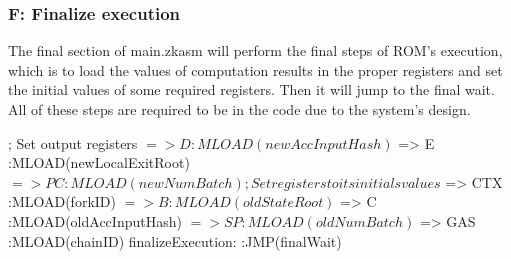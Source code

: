 


\subsubsection{F: Finalize execution}

The final section of main.zkasm will perform the final steps of ROM's execution, which is to load the values of computation results in the proper registers and set the initial values of some required registers. Then it will jump to the final wait. All of these steps are required to be in the code due to the system's design.

\begin{zkasm}
    ; Set output registers
    $ => D                          :MLOAD(newAccInputHash)
    $ => E                          :MLOAD(newLocalExitRoot)
    $ => PC                         :MLOAD(newNumBatch)
    
    ; Set registers to its initials values
    $ => CTX                        :MLOAD(forkID)
    $ => B                          :MLOAD(oldStateRoot)
    $ => C                          :MLOAD(oldAccInputHash)
    $ => SP                         :MLOAD(oldNumBatch)
    $ => GAS                        :MLOAD(chainID)
    finalizeExecution:
    :JMP(finalWait)
\end{zkasm}





